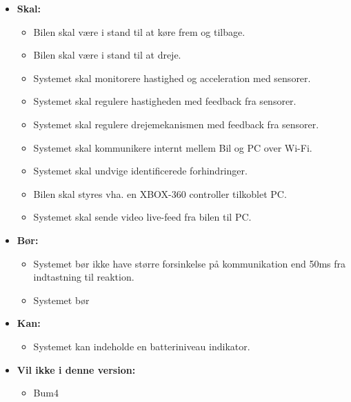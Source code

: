\begin{itemize}
	\item \textbf{Skal:}
		\begin{itemize}
			\item Bilen skal være i stand til at køre frem og tilbage.
			\item Bilen skal være i stand til at dreje.
			\item Systemet skal monitorere hastighed og acceleration med sensorer.
			\item Systemet skal regulere hastigheden med feedback fra sensorer.
			\item Systemet skal regulere drejemekanismen med feedback fra sensorer.
			\item Systemet skal kommunikere internt mellem Bil og PC over Wi-Fi.
			\item Systemet skal undvige identificerede forhindringer. 
			\item Bilen skal styres vha. en XBOX-360 controller tilkoblet PC.
			\item Systemet skal sende video live-feed fra bilen til PC.
		\end{itemize}
	\item \textbf{Bør:}
		\begin{itemize}
			\item Systemet bør ikke have større forsinkelse på kommunikation end 50ms fra indtastning til reaktion.
			\item Systemet bør 
		\end{itemize}
	\item \textbf{Kan:}
		\begin{itemize}
			\item Systemet kan indeholde en batteriniveau indikator.
		\end{itemize}
	\item \textbf{Vil ikke i denne version:}	
		\begin{itemize}
			\item Bum4
		\end{itemize}
\end{itemize}